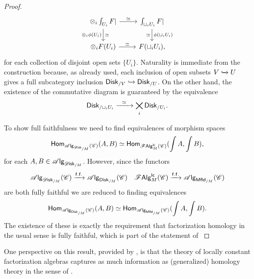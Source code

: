 \documentclass[../text]{subfiles}
\begin{document}
\begin{proof}
    \begin{equation}\label{eq:mult_strut_comm_square}
        \begin{tikzcd}
            \otimes_i \int_{U_i} F| \arrow[r, "\simeq"] \arrow[d, "\otimes_i \phi (U_i)"', "\simeq"] & \int_{\sqcup_i U_i} F| \arrow[d, "\phi (\sqcup_i U_i)", "\simeq"']\\
            \otimes_i F (U_i) \arrow[r, "\simeq"] & F (\sqcup_i U_i),
        \end{tikzcd}
    \end{equation}
    for each collection of disjoint open sets $\{U_i\}$. Naturality is immediate from the construction because, as already used, each inclusion of open subsets $V \xhookrightarrow{} U$ gives a full subcategory inclusion $\disk[r]_{/V} \xhookrightarrow{} \disk[r]_{/U}$. On the other hand, the existence of the commutative diagram is guaranteed by the equivalence
    \begin{equation}
        \disk[r]_{/\sqcup_i U_i} \xrightarrow{\ \ \simeq \ \ } \bigtimes_i \disk[r]_{/U_i}.
    \end{equation}

    To show full faithfulness we need to find equivalences of morphism spaces
    \begin{equation}
        \mathsf{Hom}_{\alg{\disk_{/M}} (\catC)} (A, B) \simeq \mathsf{Hom}_{\lcfa_M (\catC)} (\int A, \int B),
    \end{equation}
    for each $A, B \in \alg{\disk_{/M}}$. However, since the functors
    \begin{align}
        &\alg{\disk_{/M}} (\catC) \xrightarrow{\mathsf{f.f.}} \alg{\disk[r]_{/M}} (\catC) &\lcfa_M (\catC) \xrightarrow{\mathsf{f.f.}} \alg{\mfld[r]_{/M}} (\catC)
    \end{align}
    are both fully faithful we are reduced to finding equivalences
    \begin{equation}
        \mathsf{Hom}_{\alg{\disk[r]_{/M}} (\catC)} (A, B) \simeq \mathsf{Hom}_{\alg{\mfld[r]_{/M}} (\catC)} (\int A, \int B).
    \end{equation}
    The existence of these is exactly the requirement that factorization homology in the usual sense is fully faithful, which is part of the statement of \cite[lem.2.17]{aft_fhstrat}
\end{proof}

\begin{remark}
    One perspective on this result, provided by \cite[thm.2.43]{aft_fhstrat}, is that the theory of locally constant factorization algebras captures as much information as (generalized) homology theory in the sense of \cite[def.2.37]{aft_fhstrat}.
\end{remark}
\end{document}
